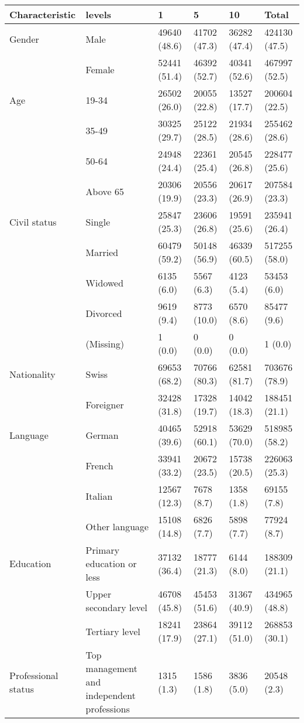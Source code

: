 
\begin{tabular}{llllll}
\toprule
Characteristic & levels & 1 & 5 & 10 & Total\\
\midrule
Gender & Male & 49640 (48.6) & 41702 (47.3) & 36282 (47.4) & 424130 (47.5)\\
 & Female & 52441 (51.4) & 46392 (52.7) & 40341 (52.6) & 467997 (52.5)\\
\addlinespace
Age & 19-34 & 26502 (26.0) & 20055 (22.8) & 13527 (17.7) & 200604 (22.5)\\
 & 35-49 & 30325 (29.7) & 25122 (28.5) & 21934 (28.6) & 255462 (28.6)\\
 & 50-64 & 24948 (24.4) & 22361 (25.4) & 20545 (26.8) & 228477 (25.6)\\
 & Above 65 & 20306 (19.9) & 20556 (23.3) & 20617 (26.9) & 207584 (23.3)\\
\addlinespace
Civil status & Single & 25847 (25.3) & 23606 (26.8) & 19591 (25.6) & 235941 (26.4)\\
 & Married & 60479 (59.2) & 50148 (56.9) & 46339 (60.5) & 517255 (58.0)\\
 & Widowed & 6135 (6.0) & 5567 (6.3) & 4123 (5.4) & 53453 (6.0)\\
 & Divorced & 9619 (9.4) & 8773 (10.0) & 6570 (8.6) & 85477 (9.6)\\
 & (Missing) & 1 (0.0) & 0 (0.0) & 0 (0.0) & 1 (0.0)\\
\addlinespace
Nationality & Swiss & 69653 (68.2) & 70766 (80.3) & 62581 (81.7) & 703676 (78.9)\\
 & Foreigner & 32428 (31.8) & 17328 (19.7) & 14042 (18.3) & 188451 (21.1)\\
\addlinespace
Language & German & 40465 (39.6) & 52918 (60.1) & 53629 (70.0) & 518985 (58.2)\\
 & French & 33941 (33.2) & 20672 (23.5) & 15738 (20.5) & 226063 (25.3)\\
 & Italian & 12567 (12.3) & 7678 (8.7) & 1358 (1.8) & 69155 (7.8)\\
 & Other language & 15108 (14.8) & 6826 (7.7) & 5898 (7.7) & 77924 (8.7)\\
\addlinespace
Education & Primary education or less & 37132 (36.4) & 18777 (21.3) & 6144 (8.0) & 188309 (21.1)\\
 & Upper secondary level & 46708 (45.8) & 45453 (51.6) & 31367 (40.9) & 434965 (48.8)\\
 & Tertiary level & 18241 (17.9) & 23864 (27.1) & 39112 (51.0) & 268853 (30.1)\\
Professional status & Top management and independent professions & 1315 (1.3) & 1586 (1.8) & 3836 (5.0) & 20548 (2.3)\\

\end{tabular}
